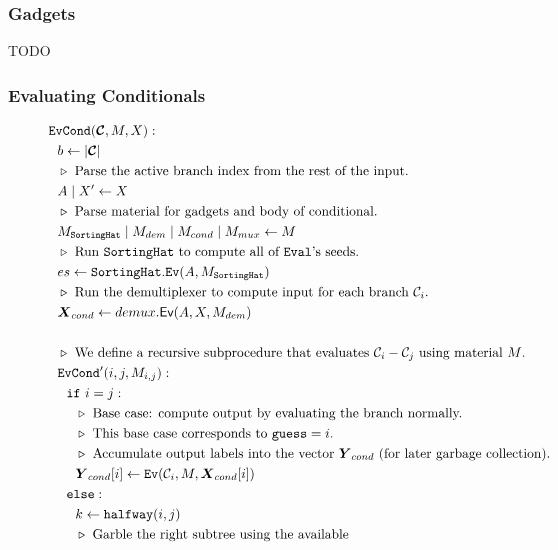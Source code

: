 \subsubsection{Gadgets}
TODO

\subsubsection{Evaluating Conditionals}

\begin{figure}
  \begin{align*}
    &\evcond(\vec{\cir}, \mat, X):\\
    &~~b \gets | \vec{\cir} |\\
    &~~\codecomment{Parse the active branch index from the rest of the
    input.}\\
    &~~\aid \mid X' \gets X\\
    &~~\codecomment{Parse material for gadgets and body of conditional.}\\
    &~~\mat_\gadget \mid \mat_{dem} \mid \mat_{cond} \mid \mat_{mux} \gets \mat\\
    &~~\codecomment{Run $\gadget$ to compute all of \E's seeds.}\\
    &~~es \gets \gadget.\mathtt{Ev}(\aid, \mat_\gadget)\\
    &~~\codecomment{Run the demultiplexer to compute input for each
    branch $\cir_i$.}\\
    &~~\vec{X}_{cond} \gets \evdem(\aid, X, \mat_{dem})\\
    \\
    &~~\codecomment{We define a recursive subprocedure that evaluates $\cir_i - \cir_j$ using material $\mat$.}\\
    &~~\evcond'(i, j, \mat_{i, j}):\\
    &~~~~\cif~i = j:\\
    &~~~~~~\codecomment{Base case: compute output by evaluating the branch normally.}\\
    &~~~~~~\codecomment{This base case corresponds to $\guess = i$.}\\
    &~~~~~~\codecomment{Accumulate output labels into the vector
    $\gcirout_{cond}$ (for later garbage collection).}\\
    &~~~~~~\gcirout_{cond}[i] \gets \ev(\cir_i, M, \gcirinp_{cond}[i])\\
    &~~~~\celse:\\
    &~~~~~~k \gets \halfway(i, j)\\
    &~~~~~~\codecomment{Garble the right subtree using the available
}
\end{align*}
\end{figure}
